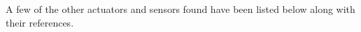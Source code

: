 \documentclass[11pt,letter]{article}
\begin{document}


\newpage
\begingroup
\hypersetup{linkcolor=black}
\tableofcontents
\listoffigures
\endgroup

\newpage







A few of the other actuators and sensors found have been listed below along with their references. 




\newpage

% 
\end{document}
